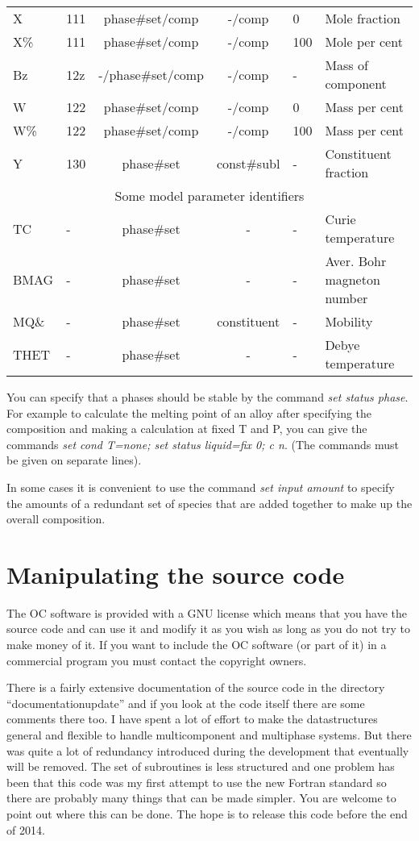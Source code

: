 \documentclass[12pt]{article}
\begin{document}
\begin{table}
\begin{tabular}{|llccll|}
X      & 111 & phase\#set/comp & -/comp & 0  & Mole fraction\\
X\%    & 111 & phase\#set/comp & -/comp & 100 & Mole per cent\\
Bz     & 12z & -/phase\#set/comp & -/comp & -  & Mass of component\\
W      & 122 & phase\#set/comp & -/comp & 0 & Mass per cent\\
W\%    & 122 & phase\#set/comp & -/comp & 100 & Mass per cent\\
Y      & 130 & phase\#set & const\#subl & -& Constituent fraction\\\hline
\multicolumn{6}{|c|}{Some model parameter identifiers}\\\hline
TC     & - & phase\#set & - & - & Curie temperature\\
BMAG   & - & phase\#set & - & - & Aver. Bohr magneton number\\
MQ\&   & - & phase\#set & constituent & - & Mobility\\
THET   & - & phase\#set & - & - & Debye temperature\\\hline
\end{tabular}
\end{table}

You can specify that a phases should be stable by the command {\em set
status phase}.  For example to calculate the melting point of an alloy
after specifying the composition and making a calculation at fixed T
and P, you can give the commands {\em set cond T=none; set status
liquid=fix 0; c n}.  (The commands must be given on separate lines).

In some cases it is convenient to use the command {\em set input
amount} to specify the amounts of a redundant set of species that are
added together to make up the overall composition.

\section{Manipulating the source code}

The OC software is provided with a GNU license which means that you
have the source code and can use it and modify it as you wish as long
as you do not try to make money of it.  If you want to include the OC
software (or part of it) in a commercial program you must contact the
copyright owners.

There is a fairly extensive documentation of the source code in the
directory ``documentationupdate'' and if you look at the code itself
there are some comments there too.  I have spent a lot of effort to
make the datastructures general and flexible to handle multicomponent
and multiphase systems.  But there was quite a lot of redundancy
introduced during the development that eventually will be removed.
The set of subroutines is less structured and one problem has been
that this code was my first attempt to use the new Fortran standard so
there are probably many things that can be made simpler.  You are
welcome to point out where this can be done.  The hope is to release
this code before the end of 2014.
\end{document}
